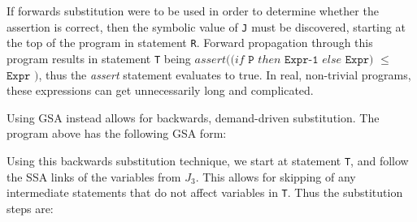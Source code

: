 If forwards substitution were to be used in order to determine whether the assertion is correct, then the symbolic value of \texttt{J} must be discovered, starting at the top of the program in statement \texttt{R}. Forward propagation through this program results in statement \texttt{T} being $assert((if $ $\texttt{P}$ $then$ $\texttt{Expr-1}$ $else$ $\texttt{Expr)}$ $\leq$ $\texttt{Expr}$  $\texttt{)}$, thus the \textit{assert} statement evaluates to true. In real, non-trivial programs, these expressions can get unnecessarily long and complicated. 

Using GSA instead allows for backwards, demand-driven substitution. The program above has the following GSA form:


Using this backwards substitution technique, we start at statement \texttt{T}, and follow the SSA links of the variables from ${J_3}$. This allows for skipping of any intermediate statements that do not affect variables in \texttt{T}. Thus the substitution steps are:


